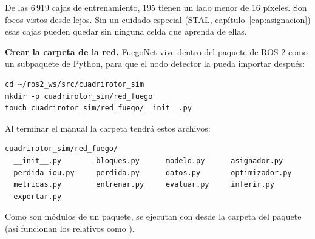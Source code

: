 \begin{tecnico}
De las 6\,919 cajas de entrenamiento, 195 tienen un lado menor de 16 píxeles.
Son focos vistos desde lejos. Sin un cuidado especial (STAL,
capítulo~\ref{cap:asignacion}) esas cajas pueden quedar sin ninguna celda
que aprenda de ellas.
\end{tecnico}

 \textbf{Crear la carpeta de la red.}
FuegoNet vive dentro del paquete de ROS 2 como un subpaquete de Python, para que
el nodo detector la pueda importar después:

\begin{lstlisting}[style=bash]
cd ~/ros2_ws/src/cuadrirotor_sim
mkdir -p cuadrirotor_sim/red_fuego
touch cuadrirotor_sim/red_fuego/__init__.py
\end{lstlisting}

Al terminar el manual la carpeta tendrá estos archivos:
\begin{lstlisting}
cuadrirotor_sim/red_fuego/
  __init__.py        bloques.py      modelo.py      asignador.py
  perdida_iou.py     perdida.py      datos.py       optimizador.py
  metricas.py        entrenar.py     evaluar.py     inferir.py
  exportar.py
\end{lstlisting}

Como son módulos de un paquete, se ejecutan con  desde la
carpeta del paquete (así funcionan los  relativos como
).

